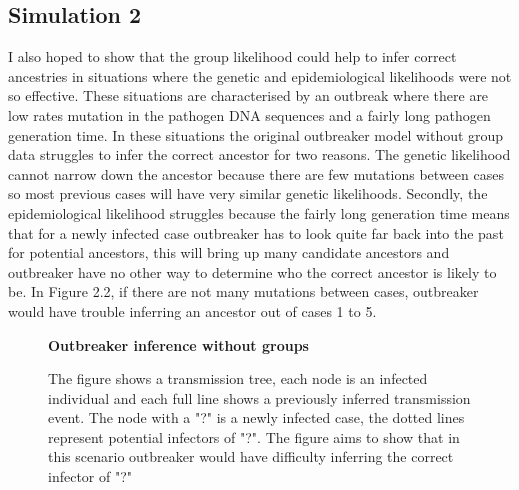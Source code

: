 \documentclass[11pt,a4paper]{report}
\begin{document}
\subsection{Simulation 2}
I also hoped to show that the group likelihood could help to infer correct ancestries in situations where the genetic and epidemiological likelihoods were not so effective. These situations are characterised by an outbreak where there are low rates mutation in the pathogen DNA sequences and a fairly long pathogen generation time. In these situations the original outbreaker model without group data struggles to infer the correct ancestor for two reasons. The genetic likelihood cannot narrow down the ancestor because there are few mutations between cases so most previous cases will have very similar genetic likelihoods. Secondly, the epidemiological likelihood struggles because the fairly long generation time means that for a newly infected case outbreaker has to look quite far back into the past for potential ancestors, this will bring up many candidate ancestors and outbreaker have no other way to determine who the correct ancestor is likely to be. In Figure 2.2, if there are not many mutations between cases, outbreaker would have trouble inferring an ancestor out of cases 1 to 5.
\\
\begin{figure}[h!]
\centering
{\bf Outbreaker inference without groups}
\caption{The figure shows a transmission tree, each node is an infected individual and each full line shows a previously inferred transmission event. The node with a "?" is a newly infected case, the dotted lines represent potential infectors of "?". The figure aims to show that in this scenario outbreaker would have difficulty inferring the correct infector of "?"}
\end{figure}
\end{document}
